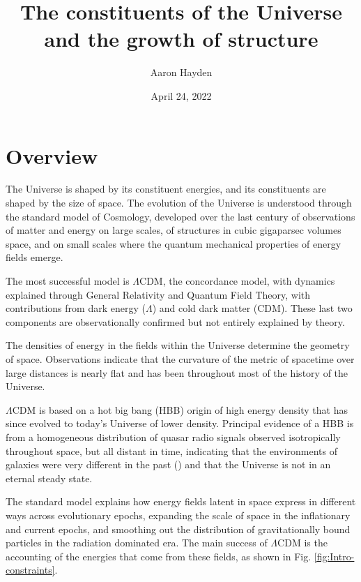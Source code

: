 \documentclass{paper}
\begin{document}
 

\title{The constituents of the Universe and the growth of structure}
\author{Aaron Hayden}
\date{April 24, 2022}
\maketitle

\section*{Overview}
  The Universe is shaped by its constituent energies, and its constituents are
  shaped by the size of space. The evolution of the Universe is understood 
  through the standard model of Cosmology, developed over the last century of 
  observations of matter and energy on large scales, of structures in cubic 
  gigaparsec volumes space, and on small scales where the quantum mechanical 
  properties of energy fields emerge. 

  The most successful model is $\Lambda$CDM, the concordance model, with 
  dynamics explained through General Relativity and Quantum Field Theory, with 
  contributions from dark energy ($\Lambda$) and cold dark matter (CDM). These 
  last two components are observationally confirmed but not entirely explained 
  by theory. 

  The densities of energy in the fields within the Universe determine the 
  geometry of space.  Observations indicate that the curvature of the metric 
  of spacetime over large distances is nearly flat and has been throughout 
  most of the history of the Universe.
  
  $\Lambda$CDM is based on a hot big bang (HBB) origin of high energy density 
  that has since evolved to today's Universe of lower density.  Principal 
  evidence of a HBB is from a homogeneous distribution of quasar radio signals 
  observed isotropically throughout space, but all distant in time, indicating 
  that the environments of galaxies were very different in the past 
  (\cite{Secrest_2021}) and that the Universe is not in an eternal steady 
  state. 

  The standard model explains how energy fields latent in space express in 
  different ways across evolutionary epochs, expanding the scale of space in 
  the inflationary and current epochs, and smoothing out the distribution of 
  gravitationally bound particles in the radiation dominated era. The main 
  success of $\Lambda$CDM is the accounting of the energies that come from 
  these fields, as shown in Fig. \ref{fig:Intro-constraints}. 
\end{document}
